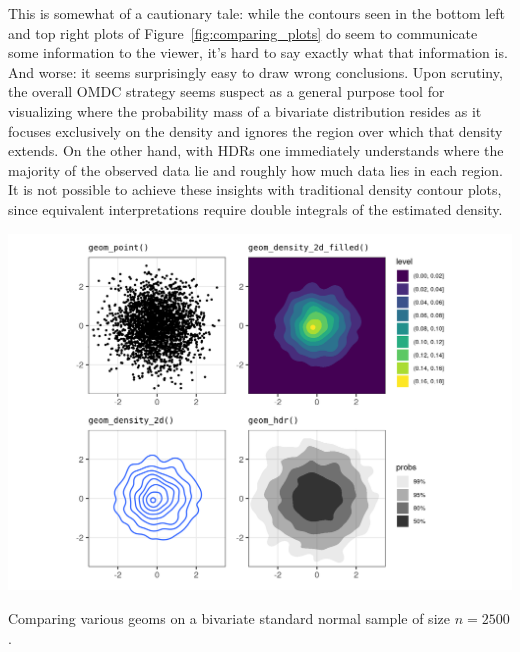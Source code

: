 This is somewhat of a cautionary tale: while the contours seen in the bottom left and top right plots of Figure~\ref{fig:comparing_plots} do seem to communicate some information to the viewer, it's hard to say exactly what that information is.
And worse: it seems surprisingly easy to draw wrong conclusions.
Upon scrutiny, the overall OMDC strategy seems suspect as a general purpose tool for visualizing where the probability mass of a bivariate distribution resides as it focuses exclusively on the density and ignores the region over which that density extends.
On the other hand, with HDRs one immediately understands where the majority of the observed data lie and
roughly how much data lies in each region.
It is not possible to achieve these insights with traditional density contour plots, since equivalent interpretations require double integrals of the estimated density.





\begin{knitrout}
\color{fgcolor}\begin{widefigure}[h!]

{\centering \includegraphics[width=\maxwidth]{figures/comparing_plots-1}

}

\caption{Comparing various geoms on a bivariate standard normal sample of size $n = 2500$.}\label{fig:comparing_plots}
\end{widefigure}

\end{knitrout}



